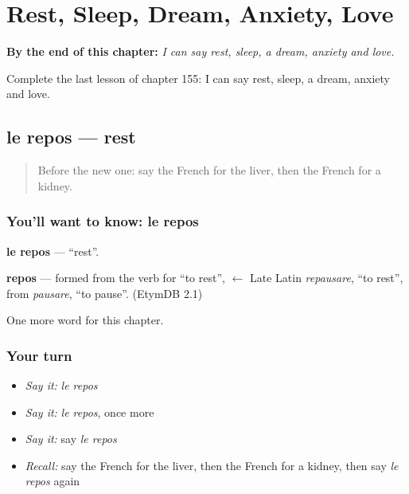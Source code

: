 
\chapter{Rest, Sleep, Dream, Anxiety, Love}
\label{ch:fr-rest-sleep-dream-anxiety-love}

\begin{chapteropening}
\textbf{By the end of this chapter:} \emph{I can say rest, sleep, a dream, anxiety and love.}

Complete the last lesson of chapter 155: I can say rest, sleep, a dream, anxiety and love.
\end{chapteropening}

\section[le repos]{le repos — rest}

\label{lesson:FR-C155-repos}



\begin{quote}
Before the new one: say the French for the liver, then the French for a kidney.
\end{quote}

\subsection*{You'll want to know: le repos}
\textbf{le repos} — \textquotedblleft{}rest\textquotedblright{}.

\begin{cousinweb}
\textbf{repos} — formed from the verb for \textquotedblleft{}to rest\textquotedblright{}, $\leftarrow$ Late Latin \emph{repausare}, \textquotedblleft{}to rest\textquotedblright{}, from \emph{pausare}, \textquotedblleft{}to pause\textquotedblright{}. (EtymDB 2.1)
\end{cousinweb}

\begin{grammarlens}[title={What you've built}]
One more word for this chapter.
\end{grammarlens}

\subsection*{Your turn}
\begin{itemize}
\raggedright
  \item \emph{Say it:} \emph{le repos}
  \item \emph{Say it:} \emph{le repos}, once more
  \item \emph{Say it:} say \emph{le repos}
  \item \emph{Recall:} say the French for the liver, then the French for a kidney, then say \emph{le repos} again
\end{itemize}

